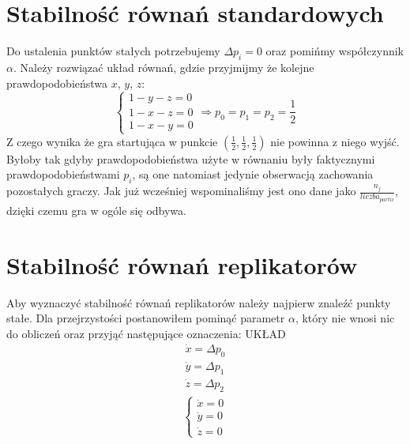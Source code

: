 \section{Stabilność równań standardowych}
\label{sec:stab_stand}
Do ustalenia punktów stałych potrzebujemy $\Delta p_i = 0$ oraz pomińmy współczynnik $\alpha$. Należy rozwiązać układ równań, gdzie przyjmijmy że kolejne prawdopodobieństwa $x$, $y$, $z$:
\begin{equation}
\left\{
\begin{array}{c}
1 - y - z = 0 \\
1 - x - z = 0 \\
1 - x - y = 0
\end{array}
\right. \Rightarrow p_0 = p_1 = p_2 = \frac{1}{2}
\end{equation}
Z czego wynika że gra startująca w punkcie $(\frac{1}{2},\frac{1}{2},\frac{1}{2})$ nie powinna z niego wyjść. Byłoby tak gdyby prawdopodobieństwa użyte w równaniu były faktycznymi prawdopodobieństwami $p_i$, są one natomiast jedynie obserwacją zachowania pozostałych graczy. Jak już wcześniej wspominaliśmy jest ono dane jako $\frac{n_j}{liczba_{partii}}$, dzięki czemu gra w ogóle się odbywa.
\section{Stabilność równań replikatorów}
\label{sec:stab_repl}
Aby wyznaczyć stabilność równań replikatorów należy najpierw znaleźć punkty stałe. Dla przejrzystości postanowiłem pominąć parametr $\alpha$, który nie wnosi nic do obliczeń oraz przyjąć następujące oznaczenia:
{\color{red} UKŁAD}
\begin{align*}
\dot{x} = \Delta p_0 \\
\dot{y} = \Delta p_1 \\
\dot{z} = \Delta p_2
\end{align*}
\begin{align*}
\left\{
\begin{array}{l}
\dot{x} = 0 \\
\dot{y} = 0 \\
\dot{z} = 0 
\end{array}
\right.
\end{align*}















